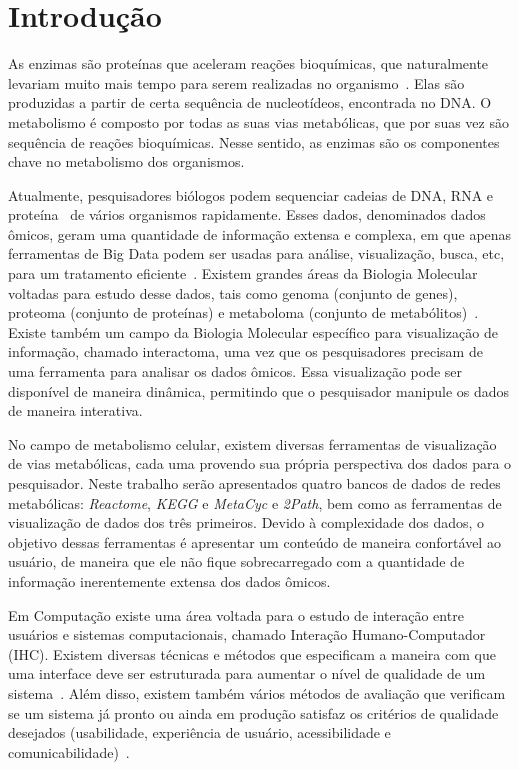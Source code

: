 \chapter{Introdução}

\indent As enzimas são proteínas que aceleram reações bioquímicas, que naturalmente levariam muito mais tempo para serem realizadas no organismo~\cite{setubal97}. Elas são produzidas a partir de certa sequência de nucleotídeos, encontrada no DNA. O metabolismo é composto por todas as suas vias metabólicas, que por suas vez são sequência de reações bioquímicas. Nesse sentido, as enzimas são os componentes chave no metabolismo dos organismos.

\indent Atualmente, pesquisadores biólogos podem sequenciar cadeias de DNA, RNA e proteína~\cite{mount01} de vários organismos rapidamente. Esses dados, denominados dados ômicos, geram uma quantidade de informação extensa e complexa, em que apenas ferramentas de Big Data podem ser usadas para análise, visualização, busca, etc, para um tratamento eficiente~\cite{berger13}. Existem grandes áreas da Biologia Molecular voltadas para estudo desse dados, tais como genoma (conjunto de genes), proteoma (conjunto de proteínas) e metaboloma (conjunto de metabólitos)~\cite{berger13}. Existe também um campo da Biologia Molecular específico para visualização de informação, chamado interactoma, uma vez que os pesquisadores precisam de uma ferramenta para analisar os dados ômicos. Essa visualização pode ser disponível de maneira dinâmica, permitindo que o pesquisador manipule os dados de maneira interativa. 

\indent No campo de metabolismo celular, existem diversas ferramentas de visualização de vias metabólicas, cada uma provendo sua própria perspectiva dos dados para o pesquisador. Neste trabalho serão apresentados quatro bancos de dados de redes metabólicas: \textit{Reactome}, \textit{KEGG} e \textit{MetaCyc} e \textit{2Path}, bem como as ferramentas de visualização de dados dos três primeiros. Devido à complexidade dos dados, o objetivo dessas ferramentas é apresentar um conteúdo de maneira confortável ao usuário, de maneira que ele não fique sobrecarregado com a quantidade de informação inerentemente extensa dos dados ômicos.

\indent Em Computação existe uma área voltada para o estudo de interação entre usuários e sistemas computacionais, chamado Interação Humano-Computador (IHC). Existem diversas técnicas e métodos que especificam a maneira com que uma interface deve ser estruturada para aumentar o nível de qualidade de um sistema~\cite{IHCbook}. Além disso, existem também vários métodos de avaliação que verificam se um sistema já pronto ou ainda em produção satisfaz os critérios de qualidade desejados (usabilidade, experiência de usuário, acessibilidade e comunicabilidade)~\cite{IHCbook}.

